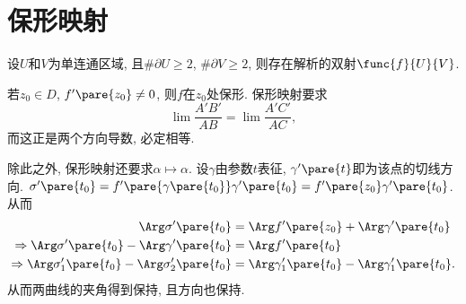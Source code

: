 \documentclass[../ComplexVariable.tex]{subfiles}
\begin{document}
\section{保形映射} %
\label{sec:保形映射}

\begin{figure}[ht]
    \centering
\end{figure}
\begin{theorem}[Riemann映射定理]
    设$U$和$V$为单连通区域, 且$\# \partial U \ge 2$, $\# \partial V \ge 2$, 则存在解析的双射$\func{f}{U}{V}$.
\end{theorem}
\begin{figure}[ht]
    \centering
\end{figure}
若$z_0 \in D$, $f'\pare{z_0}\neq 0$, 则$f$在$z_0$处保形. 保形映射要求
\[ \lim \frac{A'B'}{AB} = \lim \frac{A'C'}{AC}, \]
而这正是两个方向导数, 必定相等.

\begin{figure}[ht]
    \centering
\end{figure}

除此之外, 保形映射还要求$\alpha\mapsto \alpha$. 设$\gamma$由参数$t$表征, $\gamma'\pare{t}$即为该点的切线方向. $\sigma'\pare{t_0} = f'\pare{\gamma\pare{t_0}} \gamma'\pare{t_0} = f'\pare{z_0} \gamma'\pare{t_0}$. 从而
\begin{align*}
    \Arg \sigma'\pare{t_0} &= \Arg f'\pare{z_0} + \Arg \gamma'\pare{t_0} \\
    \Rightarrow \Arg \sigma'\pare{t_0} - \Arg \gamma'\pare{t_0} &= \Arg f'\pare{t_0} \\
    \Rightarrow \Arg \sigma'_1\pare{t_0} - \Arg\sigma'_2\pare{t_0} &= \Arg\gamma'_1\pare{t_0} - \Arg \gamma'_1\pare{t_0}.
\end{align*}
从而两曲线的夹角得到保持, 且方向也保持.
\end{document}

